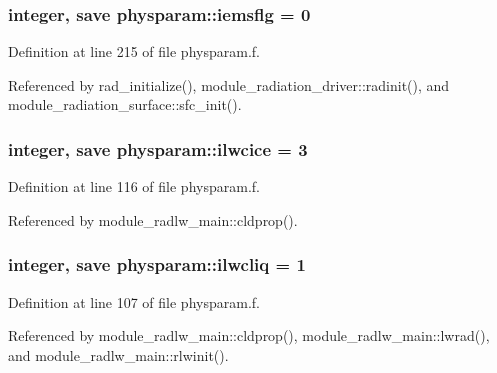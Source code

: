 \subsubsection[{\texorpdfstring{iemsflg}{iemsflg}}]{\setlength{\rightskip}{0pt plus 5cm}integer, save physparam\+::iemsflg = 0}\hypertarget{namespacephysparam_ac0ecfb79a533c6acab25971a3d871ea2}{}\label{namespacephysparam_ac0ecfb79a533c6acab25971a3d871ea2}


Definition at line 215 of file physparam.\+f.



Referenced by rad\+\_\+initialize(), module\+\_\+radiation\+\_\+driver\+::radinit(), and module\+\_\+radiation\+\_\+surface\+::sfc\+\_\+init().

\subsubsection[{\texorpdfstring{ilwcice}{ilwcice}}]{\setlength{\rightskip}{0pt plus 5cm}integer, save physparam\+::ilwcice = 3}\hypertarget{namespacephysparam_acf555c03fdb00286add9c3be7b43c32e}{}\label{namespacephysparam_acf555c03fdb00286add9c3be7b43c32e}


Definition at line 116 of file physparam.\+f.



Referenced by module\+\_\+radlw\+\_\+main\+::cldprop().

\subsubsection[{\texorpdfstring{ilwcliq}{ilwcliq}}]{\setlength{\rightskip}{0pt plus 5cm}integer, save physparam\+::ilwcliq = 1}\hypertarget{namespacephysparam_a7301d0d9b48fe408c5e67f2c145fbf7e}{}\label{namespacephysparam_a7301d0d9b48fe408c5e67f2c145fbf7e}


Definition at line 107 of file physparam.\+f.



Referenced by module\+\_\+radlw\+\_\+main\+::cldprop(), module\+\_\+radlw\+\_\+main\+::lwrad(), and module\+\_\+radlw\+\_\+main\+::rlwinit().

